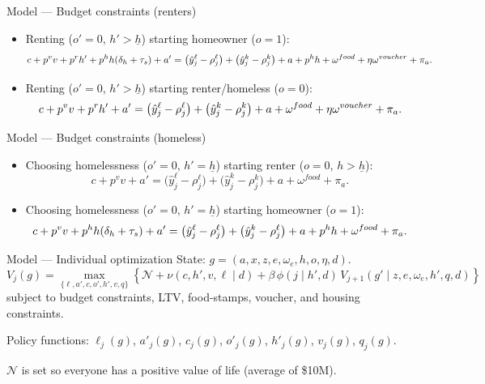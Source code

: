 \documentclass[10pt,aspectratio=169]{beamer}
\newcommand{\drug}{v}          %
\newcommand{\nondrug}{c}       %
\newcommand{\leis}{\ell}       %
\newcommand{\uutil}{\nu}       %
\newcommand{\disc}{\beta}      %
\begin{document}
\begin{frame}{Model --- Budget constraints (renters)}
\small
\begin{itemize}
\item Renting ($o'=0$, $h'>\underline{h}$) starting homeowner ($o=1$):
\[
\nondrug + p^v \drug + p^r h' + p^h h(\delta_h+\tau_s) + a' \\
= \big(\hat y^{\leis}_j-\rho^{\leis}_j\big)+\big(\hat y^k_j-\rho^k_j\big)+a+p^h h+\omega^{food}+\eta\omega^{voucher}+\pi_a.
\]
\item Renting ($o'=0$, $h'>\underline{h}$) starting renter/homeless ($o=0$):
\[
\nondrug + p^v \drug + p^r h' + a' \\
= \big(\hat y^{\leis}_j-\rho^{\leis}_j\big)+\big(\hat y^k_j-\rho^k_j\big)+a+\omega^{food}+\eta\omega^{voucher}+\pi_a.
\]
\end{itemize}
\end{frame}

\begin{frame}{Model --- Budget constraints (homeless)}
\small
\begin{itemize}
\item Choosing homelessness ($o'=0$, $h'=\underline{h}$) starting renter ($o=0$, $h>\underline{h}$):
\[
\nondrug + p^v \drug + a'
= \big(\hat y^{\leis}_j-\rho^{\leis}_j\big)+\big(\hat y^k_j-\rho^k_j\big)+a+\omega^{food}+\pi_a.
\]
\item Choosing homelessness ($o'=0$, $h'=\underline{h}$) starting homeowner ($o=1$):
\[
\nondrug + p^v \drug + p^h h(\delta_h+\tau_s) + a' \\
= \big(\hat y^{\leis}_j-\rho^{\leis}_j\big)+\big(\hat y^k_j-\rho^{\leis}_j\big)+a+p^h h+\omega^{food}+\pi_a.
\]
\end{itemize}
\end{frame}

\begin{frame}{Model --- Individual optimization}
\small
State: $g=(a,x,z,e,\omega_e,h,o,\eta,d)$.
\[
V_j(g)=\max_{\{\leis,a',\nondrug,o',h',\drug,q\}}
\left\{\mathcal{N}+\uutil(\nondrug,h',\drug,\leis\mid d)+
\disc\,\phi(j\mid h',d)\,V_{j+1}(g'\mid z,e,\omega_e,h',q,d)\right\}
\]
subject to budget constraints, LTV, food-stamps, voucher, and housing constraints.

\vspace{0.25em}
Policy functions: $\leis_j(g)$, $a'_j(g)$, $\nondrug_j(g)$, $o'_j(g)$, $h'_j(g)$, $\drug_j(g)$, $q_j(g)$.

\vspace{0.25em}
$\mathcal{N}$ is set so everyone has a positive value of life (average of \$10M).
\end{frame}
\end{document}
